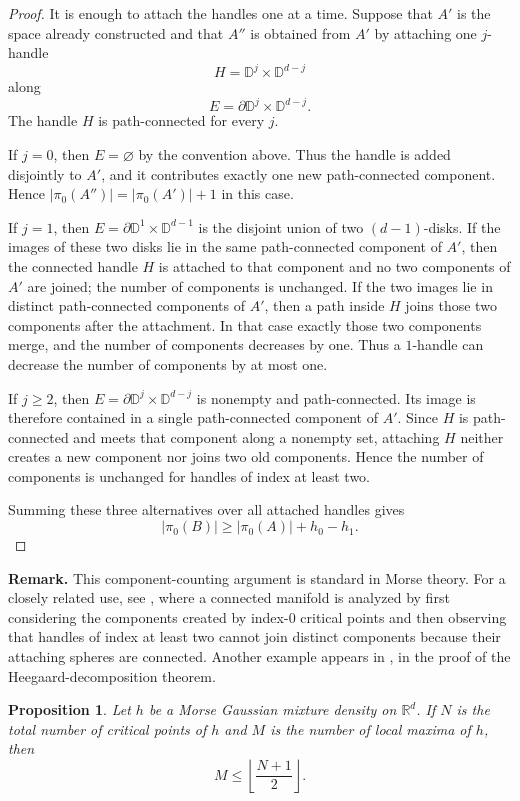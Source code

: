 \documentclass[11pt]{article}
\theoremstyle{plain}
\newtheorem{proposition}[theorem]{Proposition}
\theoremstyle{definition}
\theoremstyle{remark}
\numberwithin{equation}{section}
\newcommand{\R}{\mathbb{R}}
\begin{document}
\begin{proof}
It is enough to attach the handles one at a time. Suppose that $A'$ is the space already constructed and that $A''$ is obtained from $A'$ by attaching one $j$-handle
\[
H=\mathbb D^j\times\mathbb D^{d-j}
\]
along
\[
E=\partial\mathbb D^j\times\mathbb D^{d-j}.
\]
The handle $H$ is path-connected for every $j$.

If $j=0$, then $E=\varnothing$ by the convention above. Thus the handle is added disjointly to $A'$, and it contributes exactly one new path-connected component. Hence $|\pi_0(A'')|=|\pi_0(A')|+1$ in this case.

If $j=1$, then $E=\partial\mathbb D^1\times\mathbb D^{d-1}$ is the disjoint union of two $(d-1)$-disks. If the images of these two disks lie in the same path-connected component of $A'$, then the connected handle $H$ is attached to that component and no two components of $A'$ are joined; the number of components is unchanged. If the two images lie in distinct path-connected components of $A'$, then a path inside $H$ joins those two components after the attachment. In that case exactly those two components merge, and the number of components decreases by one. Thus a $1$-handle can decrease the number of components by at most one.

If $j\ge2$, then $E=\partial\mathbb D^j\times\mathbb D^{d-j}$ is nonempty and path-connected. Its image is therefore contained in a single path-connected component of $A'$. Since $H$ is path-connected and meets that component along a nonempty set, attaching $H$ neither creates a new component nor joins two old components. Hence the number of components is unchanged for handles of index at least two.

Summing these three alternatives over all attached handles gives
\[
|\pi_0(B)|\ge |\pi_0(A)|+h_0-h_1.
\]
\end{proof}

\noindent\textbf{Remark.} This component-counting argument is standard in Morse theory. For a closely related use, see \citet[Theorem~3.22]{Knudson2015}, where a connected manifold is analyzed by first considering the components created by index-$0$ critical points and then observing that handles of index at least two cannot join distinct components because their attaching spheres are connected. Another example appears in \citet[Theorem~2.37]{Nicolaescu2011}, in the proof of the Heegaard-decomposition theorem.


\begin{proposition}\label{prop:morse-half}
Let $h$ be a Morse Gaussian mixture density on $\R^d$. If $N$ is the total number of critical points of $h$ and $M$ is the number of local maxima of $h$, then
\[
M\le \left\lfloor\frac{N+1}{2}\right\rfloor.
\]
\end{proposition}
\end{document}
